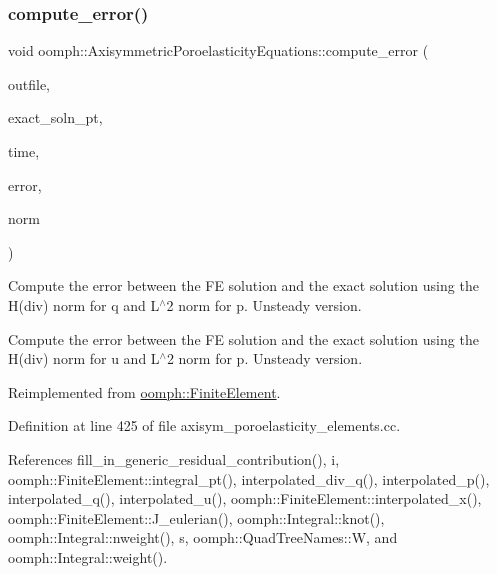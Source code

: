 \subsubsection{\texorpdfstring{compute\+\_\+error()}{compute\_error()}\hspace{0.1cm}{\footnotesize\ttfamily [2/2]}}
{\footnotesize\ttfamily void oomph\+::\+Axisymmetric\+Poroelasticity\+Equations\+::compute\+\_\+error (\begin{DoxyParamCaption}\item[{std\+::ostream \&}]{outfile,  }\item[{\hyperlink{classoomph_1_1FiniteElement_ad4ecf2b61b158a4b4d351a60d23c633e}{Finite\+Element\+::\+Unsteady\+Exact\+Solution\+Fct\+Pt}}]{exact\+\_\+soln\+\_\+pt,  }\item[{const double \&}]{time,  }\item[{\hyperlink{classoomph_1_1Vector}{Vector}$<$ double $>$ \&}]{error,  }\item[{\hyperlink{classoomph_1_1Vector}{Vector}$<$ double $>$ \&}]{norm }\end{DoxyParamCaption})\hspace{0.3cm}{\ttfamily [virtual]}}



Compute the error between the FE solution and the exact solution using the H(div) norm for q and L$^\wedge$2 norm for p. Unsteady version. 

Compute the error between the FE solution and the exact solution using the H(div) norm for u and L$^\wedge$2 norm for p. Unsteady version. 

Reimplemented from \hyperlink{classoomph_1_1FiniteElement_a6c1220af04b60c1a1c34b44495188daf}{oomph\+::\+Finite\+Element}.



Definition at line 425 of file axisym\+\_\+poroelasticity\+\_\+elements.\+cc.



References fill\+\_\+in\+\_\+generic\+\_\+residual\+\_\+contribution(), i, oomph\+::\+Finite\+Element\+::integral\+\_\+pt(), interpolated\+\_\+div\+\_\+q(), interpolated\+\_\+p(), interpolated\+\_\+q(), interpolated\+\_\+u(), oomph\+::\+Finite\+Element\+::interpolated\+\_\+x(), oomph\+::\+Finite\+Element\+::\+J\+\_\+eulerian(), oomph\+::\+Integral\+::knot(), oomph\+::\+Integral\+::nweight(), s, oomph\+::\+Quad\+Tree\+Names\+::W, and oomph\+::\+Integral\+::weight().

\mbox{\label{classoomph_1_1AxisymmetricPoroelasticityEquations_ac5a86eb17bdc912476cce98eef4d0ffc}} 

